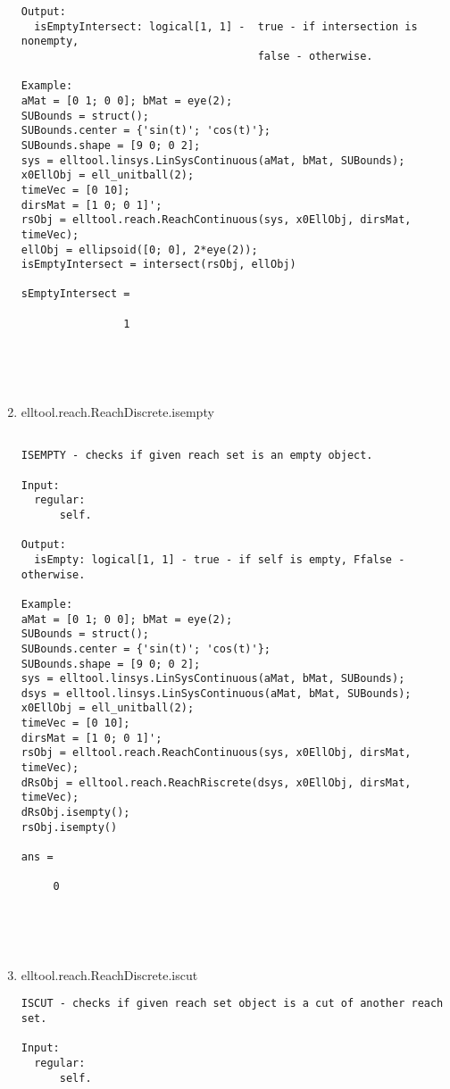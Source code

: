 \begin{enumerate}
\begin{lstlisting}
Output:
  isEmptyIntersect: logical[1, 1] -  true - if intersection is nonempty,
                                     false - otherwise.

Example:
aMat = [0 1; 0 0]; bMat = eye(2);
SUBounds = struct();
SUBounds.center = {'sin(t)'; 'cos(t)'};
SUBounds.shape = [9 0; 0 2];
sys = elltool.linsys.LinSysContinuous(aMat, bMat, SUBounds);
x0EllObj = ell_unitball(2);
timeVec = [0 10];
dirsMat = [1 0; 0 1]';
rsObj = elltool.reach.ReachContinuous(sys, x0EllObj, dirsMat, timeVec);
ellObj = ellipsoid([0; 0], 2*eye(2));
isEmptyIntersect = intersect(rsObj, ellObj)

sEmptyIntersect =

                1





\end{lstlisting}
\fontfamily{\familydefault}
\selectfont
\item {elltool.reach.ReachDiscrete.isempty}
\selectfont
\begin{lstlisting}

ISEMPTY - checks if given reach set is an empty object.

Input:
  regular:
      self.

Output:
  isEmpty: logical[1, 1] - true - if self is empty, Ffalse - otherwise.

Example:
aMat = [0 1; 0 0]; bMat = eye(2);
SUBounds = struct();
SUBounds.center = {'sin(t)'; 'cos(t)'};
SUBounds.shape = [9 0; 0 2];
sys = elltool.linsys.LinSysContinuous(aMat, bMat, SUBounds);
dsys = elltool.linsys.LinSysContinuous(aMat, bMat, SUBounds);
x0EllObj = ell_unitball(2);
timeVec = [0 10];
dirsMat = [1 0; 0 1]';
rsObj = elltool.reach.ReachContinuous(sys, x0EllObj, dirsMat, timeVec);
dRsObj = elltool.reach.ReachRiscrete(dsys, x0EllObj, dirsMat, timeVec);
dRsObj.isempty();
rsObj.isempty()

ans =

     0





\end{lstlisting}
\fontfamily{\familydefault}
\selectfont
\item {elltool.reach.ReachDiscrete.iscut}
\selectfont
\begin{lstlisting}
ISCUT - checks if given reach set object is a cut of another reach set.

Input:
  regular:
      self.


\end{lstlisting}
\end{enumerate}

